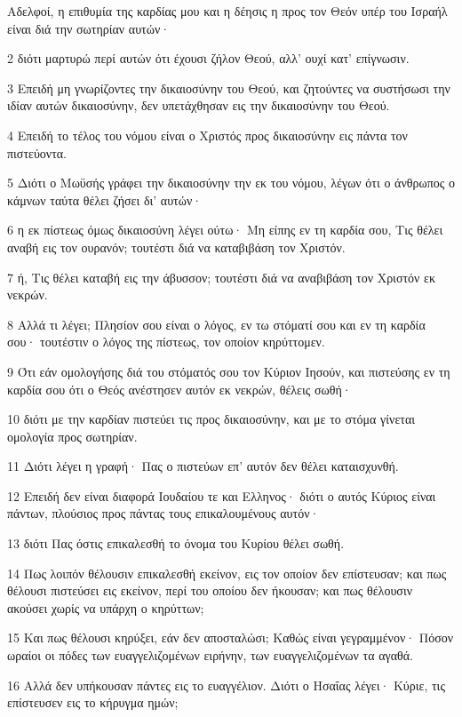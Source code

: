 \par Αδελφοί, η επιθυμία της καρδίας μου και η δέησις η προς τον Θεόν υπέρ του Ισραήλ είναι διά την σωτηρίαν αυτών·
\par 2 διότι μαρτυρώ περί αυτών ότι έχουσι ζήλον Θεού, αλλ' ουχί κατ' επίγνωσιν.
\par 3 Επειδή μη γνωρίζοντες την δικαιοσύνην του Θεού, και ζητούντες να συστήσωσι την ιδίαν αυτών δικαιοσύνην, δεν υπετάχθησαν εις την δικαιοσύνην του Θεού.
\par 4 Επειδή το τέλος του νόμου είναι ο Χριστός προς δικαιοσύνην εις πάντα τον πιστεύοντα.
\par 5 Διότι ο Μωϋσής γράφει την δικαιοσύνην την εκ του νόμου, λέγων ότι ο άνθρωπος ο κάμνων ταύτα θέλει ζήσει δι' αυτών·
\par 6 η εκ πίστεως όμως δικαιοσύνη λέγει ούτω· Μη είπης εν τη καρδία σου, Τις θέλει αναβή εις τον ουρανόν; τουτέστι διά να καταβιβάση τον Χριστόν.
\par 7 ή, Τις θέλει καταβή εις την άβυσσον; τουτέστι διά να αναβιβάση τον Χριστόν εκ νεκρών.
\par 8 Αλλά τι λέγει; Πλησίον σου είναι ο λόγος, εν τω στόματί σου και εν τη καρδία σου· τουτέστιν ο λόγος της πίστεως, τον οποίον κηρύττομεν.
\par 9 Ότι εάν ομολογήσης διά του στόματός σου τον Κύριον Ιησούν, και πιστεύσης εν τη καρδία σου ότι ο Θεός ανέστησεν αυτόν εκ νεκρών, θέλεις σωθή·
\par 10 διότι με την καρδίαν πιστεύει τις προς δικαιοσύνην, και με το στόμα γίνεται ομολογία προς σωτηρίαν.
\par 11 Διότι λέγει η γραφή· Πας ο πιστεύων επ' αυτόν δεν θέλει καταισχυνθή.
\par 12 Επειδή δεν είναι διαφορά Ιουδαίου τε και Ελληνος· διότι ο αυτός Κύριος είναι πάντων, πλούσιος προς πάντας τους επικαλουμένους αυτόν·
\par 13 διότι Πας όστις επικαλεσθή το όνομα του Κυρίου θέλει σωθή.
\par 14 Πως λοιπόν θέλουσιν επικαλεσθή εκείνον, εις τον οποίον δεν επίστευσαν; και πως θέλουσι πιστεύσει εις εκείνον, περί του οποίου δεν ήκουσαν; και πως θέλουσιν ακούσει χωρίς να υπάρχη ο κηρύττων;
\par 15 Και πως θέλουσι κηρύξει, εάν δεν αποσταλώσι; Καθώς είναι γεγραμμένον· Πόσον ωραίοι οι πόδες των ευαγγελιζομένων ειρήνην, των ευαγγελιζομένων τα αγαθά.
\par 16 Αλλά δεν υπήκουσαν πάντες εις το ευαγγέλιον. Διότι ο Ησαΐας λέγει· Κύριε, τις επίστευσεν εις το κήρυγμα ημών;
